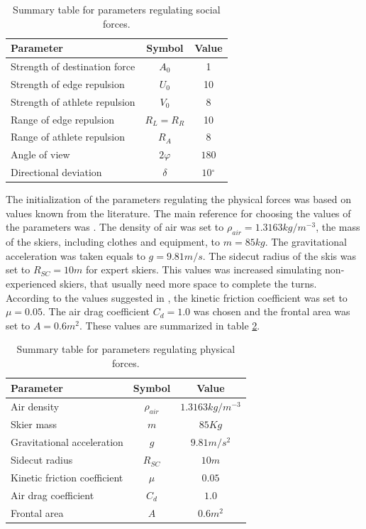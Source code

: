 \documentclass[12pt,a4paper,twoside]{book}
\newcommand{\degree}{\ensuremath{^\circ}}
\begin{document}
\begin{table}
  \centering
  \begin{tabular}{ | l | c | c | }
    \hline
    Parameter & Symbol & Value \\
    \hline
    Strength of destination force & $A_0$ & 1 \\
    Strength of edge repulsion & $U_0$ & 10 \\
    Strength of athlete repulsion & $V_0$ & 8 \\
    Range of edge repulsion & $R_L=R_R$ & 10 \\
    Range of athlete repulsion & $R_A$ & 8 \\
    Angle of view & $2\varphi$ & $180$ \\
    Directional deviation & $\delta$ & $10\degree$ \\
    \hline
  \end{tabular}
  \caption{Summary table for parameters regulating social forces.}
  \label{social_parameters_table}
\end{table}

The initialization of the parameters regulating the physical forces was based on values known from the literature. The main reference for choosing the values of the parameters was \cite{hol2012}. The density of air was set to $\rho_{air}=1.3163 kg/m^{-3}$, the mass of the skiers, including clothes and equipment, to $m=85 kg$. The gravitational acceleration was taken equals to $g=9.81 m/s$. The sidecut radius of the skis was set to $R_{SC}=10 m$ for expert skiers. This values was increased simulating non-experienced skiers, that usually need more space to complete the turns. According to the values suggested in \cite{bu2004}, the kinetic friction coefficient was set to $\mu = 0.05$. The air drag coefficient $C_d = 1.0$ was chosen and the frontal area was set to $A=0.6 m^2$. These values are summarized in table \ref{physical_parameters_table}.

\begin{table}
  \centering
  \begin{tabular}{ | l | c | c |}
    \hline
    Parameter & Symbol & Value \\
    \hline
    Air density & $\rho_{air}$ & $1.3163 kg/m^{-3}$ \\
    Skier mass & $m$ & $85 Kg$ \\
    Gravitational acceleration & $g$ & $9.81 m/s^2$ \\
    Sidecut radius & $R_{SC}$ & $10m$ \\
    Kinetic friction coefficient & $\mu$ & $0.05$ \\
    Air drag coefficient & $C_d$ & $1.0$ \\
    Frontal area & $A$ & $0.6 m^2$ \\
    \hline
  \end{tabular}
  \caption{Summary table for parameters regulating physical forces.}
  \label{physical_parameters_table}
\end{table}
\end{document}
